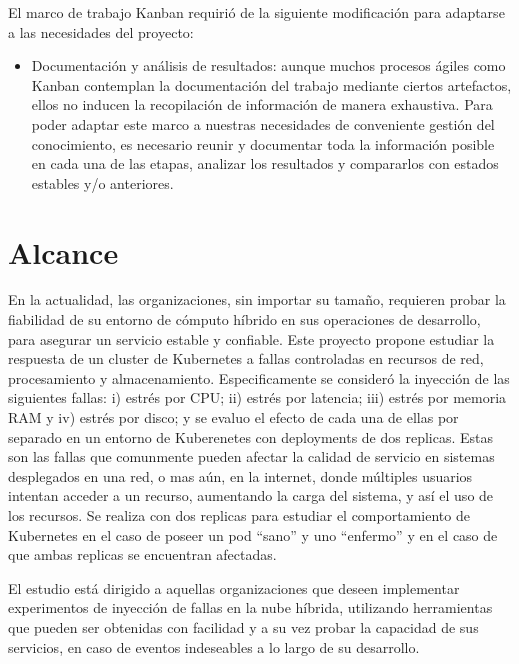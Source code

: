 \par El marco de trabajo Kanban requirió de la siguiente modificación para adaptarse a las necesidades del proyecto:
\begin{itemize}
    \item Documentación y análisis de resultados: aunque muchos procesos ágiles como Kanban contemplan la documentación del trabajo mediante ciertos artefactos, ellos no inducen la recopilación de información de manera exhaustiva. Para poder adaptar este marco a nuestras necesidades de conveniente gestión del conocimiento, es necesario reunir y documentar toda la información posible en cada una de las etapas, analizar los resultados y compararlos con estados estables y/o anteriores. 
\end{itemize}
 
\section{Alcance}


\par En la actualidad, las organizaciones, sin importar su tamaño, requieren probar la fiabilidad de su entorno de cómputo híbrido en sus operaciones de desarrollo, para asegurar un servicio estable y confiable. Este proyecto propone estudiar la respuesta de un cluster de Kubernetes a fallas controladas en recursos de red, procesamiento y almacenamiento. Especificamente se consider\'o la inyecci\'on de las siguientes fallas: i) estr\'es por CPU; ii) estr\'es por latencia; iii) estr\'es por memoria RAM y iv) estr\'es por disco; y se evaluo el efecto de cada una de ellas por separado en un entorno de Kuberenetes con deployments de dos replicas. Estas son las fallas que comunmente pueden afectar la calidad de servicio en sistemas desplegados en una red, o mas a\'un, en la internet, donde m\'ultiples usuarios intentan acceder a un recurso, aumentando la carga del sistema, y as\'i el uso de los recursos. Se realiza con dos replicas para estudiar el comportamiento de Kubernetes en el caso de poseer un pod ``sano'' y uno ``enfermo'' y en el caso de que ambas replicas se encuentran afectadas. \\ %

\par El estudio está dirigido a aquellas organizaciones que deseen implementar experimentos de inyección de fallas en la nube híbrida, utilizando herramientas que pueden ser obtenidas con facilidad y a su vez probar la capacidad de sus servicios, en caso de eventos indeseables a lo largo de su desarrollo. \\

